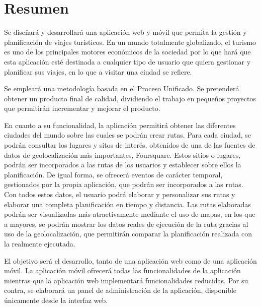 \newpage
\chapter*{Resumen}
Se diseñará y desarrollará una aplicación web y móvil que permita la gestión y planificación de viajes turísticos. En un mundo totalmente globalizado, el turismo es uno de los principales motores económicos de la sociedad por lo que hará que esta aplicación esté destinada a cualquier tipo de usuario que quiera gestionar y planificar sus viajes, en lo que a visitar una ciudad se refiere.

Se empleará una metodología basada en el Proceso Unificado. Se pretenderá obtener un producto final de calidad, dividiendo el trabajo en pequeños proyectos que permitirán incrementar y mejorar el producto.

En cuanto a su funcionalidad, la aplicación permitirá obtener las diferentes ciudades del mundo sobre las cuales se podrán crear rutas. Para cada ciudad, se podrán consultar los lugares y sitos de interés, obtenidos de una de las fuentes de datos de geolocalización más importantes, Foursquare. Estos sitios o lugares, podrán ser incorporados a las rutas de los usuarios y establecer sobre ellos la planificación. De igual forma, se ofrecerá eventos de carácter temporal, gestionados por la propia aplicación, que podrán ser incorporados a las rutas. Con todos estos datos, el usuario podrá elaborar y personalizar sus rutas y elaborar una completa planificación en tiempo y distancia. Las rutas elaboradas podrán ser visualizadas más atractivamente mediante el uso de mapas, en los que a mayores, se podrán mostrar los datos reales de ejecución de la ruta gracias al uso de la geolocalización, que permitirán comparar la planificación realizada con la realmente ejecutada.

El objetivo será el desarrollo, tanto de una aplicación web como de una aplicación móvil. La aplicación móvil ofrecerá todas las funcionalidades de la aplicación mientras que la aplicación web implementará funcionalidades reducidas. Por su contra, se elaborará un panel de administración de la aplicación, disponible únicamente desde la interfaz web.